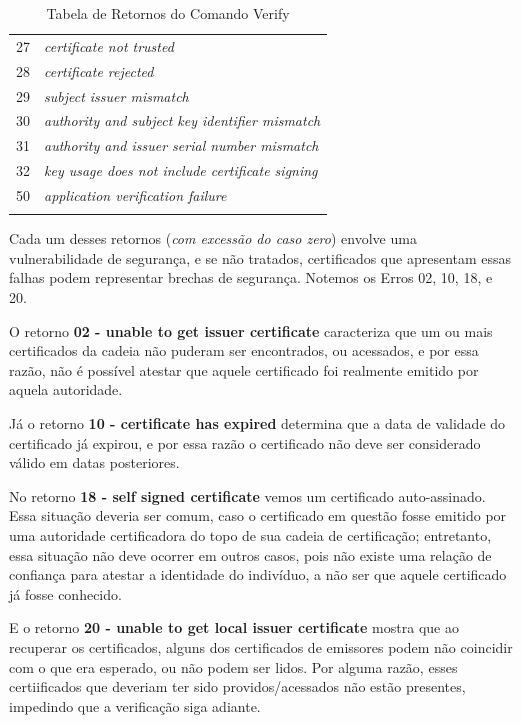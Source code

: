 \begin{center}
\begin{longtable}{c>{\em}l}
		27 & certificate not trusted \\ 
		\rowcolor[gray]{0.9}
		28 & certificate rejected \\ 
		29 & subject issuer mismatch \\ 
		\rowcolor[gray]{0.9}
		30 & authority and subject key identifier mismatch \\ 
		31 & authority and issuer serial number mismatch \\ 
		\rowcolor[gray]{0.9}
		32 & key usage does not include certificate signing \\ 
		50 & application verification failure \\ 
		\bottomrule
		\caption{Tabela de Retornos do Comando Verify}
		\end{longtable}
	\end{center}

	Cada um desses retornos (\textit{com excessão do caso zero}) envolve uma vulnerabilidade de segurança, e se não tratados, certificados que apresentam essas falhas podem representar brechas de segurança. Notemos os Erros 02, 10, 18, e 20.

	O retorno \textbf{02 - unable to get issuer certificate} caracteriza que um ou mais certificados da cadeia não puderam ser encontrados, ou acessados, e por essa razão, não é possível atestar que aquele certificado foi realmente emitido por aquela autoridade.

	Já o retorno \textbf{10 - certificate has expired} determina que a data de validade do certificado já expirou, e por essa razão o certificado não deve ser considerado válido em datas posteriores.

	No retorno \textbf{18 - self signed certificate} vemos um certificado auto-assinado. Essa situação deveria ser comum, caso o certificado em questão fosse emitido por uma autoridade certificadora do topo de sua cadeia de certificação; entretanto, essa situação não deve ocorrer em outros casos, pois não existe uma relação de confiança para atestar a identidade do indivíduo, a não ser que aquele certificado já fosse conhecido.

	E o retorno \textbf{20 - unable to get local issuer certificate} mostra que ao recuperar os certificados, alguns dos certificados de emissores podem não coincidir com o que era esperado, ou não podem ser lidos. Por alguma razão, esses certiificados que deveriam ter sido providos/acessados não estão presentes, impedindo que a verificação siga adiante.
